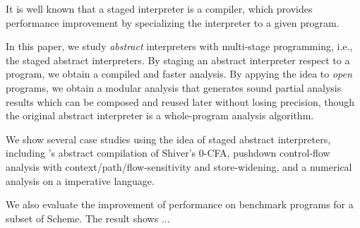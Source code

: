 It is well known that a staged interpreter is a compiler, which provides performance improvement
by specializing the interpreter to a given program.

In this paper, we study \textit{abstract} interpreters with multi-stage programming, i.e., the 
staged abstract interpreters. 
By staging an abstract interpreter respect to a program, we obtain a compiled and faster analysis.
By appying the idea to \textit{open} programs, we obtain a modular analysis that generates sound
partial analysis results which can be composed and reused later without losing precision, though 
the original abstract interpreter is a whole-program analysis algorithm.

We show several case studies using the idea of staged abstract interpreters, including 
\citeauthor{Boucher:1996:ACN:647473.727587}'s abstract compilation of Shiver's 0-CFA, pushdown
control-flow analysis with context/path/flow-sensitivity and store-widening, and a numerical
analysis on a imperative language.

We also evaluate the improvement of performance on benchmark programs for a subset of Scheme.
The result shows ...


